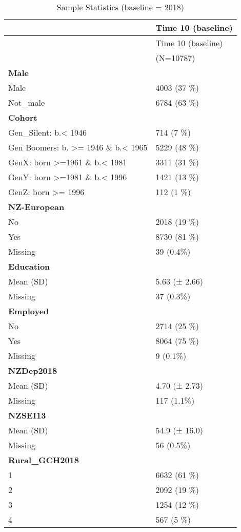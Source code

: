 \documentclass[
  singlecolumn]{report}
\begin{document}
\hypertarget{tbl-sample}{}
\begin{longtable}[]{@{}ll@{}}
\caption{\label{tbl-sample}Sample Statistics (baseline =
2018)}\tabularnewline
\toprule\noalign{}
& Time 10 (baseline) \\
\midrule\noalign{}
\endfirsthead
\toprule\noalign{}
& Time 10 (baseline) \\
\midrule\noalign{}
\endhead
\bottomrule\noalign{}
\endlastfoot
& (N=10787) \\
\textbf{Male} & \\
Male & 4003 (37 \%) \\
Not\_male & 6784 (63 \%) \\
\textbf{Cohort} & \\
Gen\_Silent: b.\textless{} 1946 & 714 (7 \%) \\
Gen Boomers: b. \textgreater= 1946 \& b.\textless{} 1965 & 5229 (48
\%) \\
GenX: born \textgreater=1961 \& b.\textless{} 1981 & 3311 (31 \%) \\
GenY: born \textgreater=1981 \& b.\textless{} 1996 & 1421 (13 \%) \\
GenZ: born \textgreater= 1996 & 112 (1 \%) \\
\textbf{NZ-European} & \\
No & 2018 (19 \%) \\
Yes & 8730 (81 \%) \\
Missing & 39 (0.4\%) \\
\textbf{Education} & \\
Mean (SD) & 5.63 (± 2.66) \\
Missing & 37 (0.3\%) \\
\textbf{Employed} & \\
No & 2714 (25 \%) \\
Yes & 8064 (75 \%) \\
Missing & 9 (0.1\%) \\
\textbf{NZDep2018} & \\
Mean (SD) & 4.70 (± 2.73) \\
Missing & 117 (1.1\%) \\
\textbf{NZSEI13} & \\
Mean (SD) & 54.9 (± 16.0) \\
Missing & 56 (0.5\%) \\
\textbf{Rural\_GCH2018} & \\
1 & 6632 (61 \%) \\
2 & 2092 (19 \%) \\
3 & 1254 (12 \%) \\
4 & 567 (5 \%) \\

\end{longtable}
\end{document}
